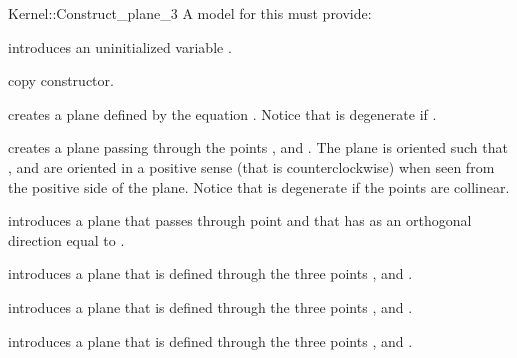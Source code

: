 \begin{ccRefFunctionObjectConcept}{Kernel::Construct_plane_3}
A model for this must provide:


\ccHidden {}
             {introduces an uninitialized variable .}

\ccHidden {}
 	    {copy constructor.}

{creates a plane  defined by the equation
 .
Notice that  is degenerate if .}

{creates a plane  passing through the points ,
  and . The plane is oriented such that , 
  and  are oriented in a positive sense 
 (that is counterclockwise) when seen from the positive side of the plane.
Notice that  is degenerate if the points are collinear.}


{introduces a plane  that passes through point  and
 that has as an orthogonal direction equal to .}

{introduces a plane  that is defined through the  three points 
 ,  and .}

{introduces a plane  that is defined through the  three points 
 ,  and .}

{introduces a plane  that is defined through the  three points 
 ,  and .}

\end{ccRefFunctionObjectConcept}
